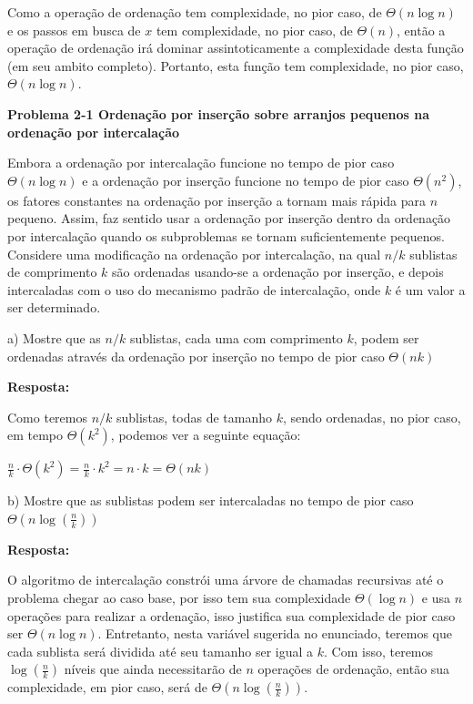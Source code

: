 \documentclass{article}
\begin{document}
    Como a operação de ordenação tem complexidade, no pior caso, de $\Theta(n \log n)$ e os passos em busca de $x$ tem complexidade, no pior caso, de $\Theta(n)$, então a operação de ordenação irá dominar assintoticamente a complexidade desta função (em seu ambito completo). Portanto, esta função tem complexidade, no pior caso, $\Theta(n \log n)$.


    \textbf{Problema 2-1 
    Ordenação por inserção sobre arranjos pequenos na ordenação por intercalação}

    Embora a ordenação por intercalação funcione no tempo de pior caso $\Theta(n \log n)$ e a ordenação por inserção funcione no tempo de pior caso $\Theta(n^2)$, os fatores constantes na ordenação por inserção a tornam mais rápida para $n$ pequeno. Assim, faz sentido usar a ordenação por inserção dentro da ordenação por intercalação quando os subproblemas se tornam suficientemente pequenos. Considere uma modificação na ordenação por intercalação, na qual $n/k$ sublistas de comprimento $k$ são ordenadas usando-se a ordenação por inserção, e depois intercaladas com o uso do mecanismo padrão de intercalação, onde $k$ é um valor a ser determinado.

    a) Mostre que as $n/k$ sublistas, cada uma com comprimento $k$, podem ser ordenadas através da ordenação por inserção no tempo de pior caso $\Theta(nk)$

    \textbf{Resposta:}

    Como teremos $n/k$ sublistas, todas de tamanho $k$, sendo ordenadas, no pior caso, em tempo $\Theta(k^2)$, podemos ver a seguinte equação:

    $\frac{n}{k} \cdot \Theta(k^2) = \frac{n}{k} \cdot k^2 = n \cdot k = \Theta(nk)$

    b) Mostre que as sublistas podem ser intercaladas no tempo de pior caso $\Theta(n \log (\frac{n}{k}))$

    \textbf{Resposta:}

    O algoritmo de intercalação constrói uma árvore de chamadas recursivas até o problema chegar ao caso base, por isso tem sua complexidade $\Theta(\log n)$ e usa $n$ operações para realizar a ordenação, isso justifica sua complexidade de pior caso ser $\Theta(n \log n)$. Entretanto, nesta variável sugerida no enunciado, teremos que cada sublista será dividida até seu tamanho ser igual a $k$. Com isso, teremos $\log (\frac{n}{k})$ níveis que ainda necessitarão de $n$ operações de ordenação, então sua complexidade, em pior caso, será de $\Theta(n \log (\frac{n}{k}))$.
\end{document}

